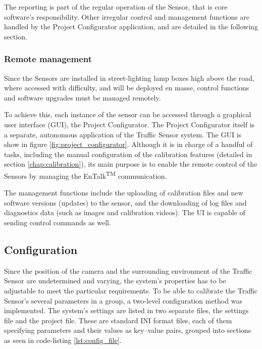 The reporting is part of the regular operation of the Sensor, that is core software's responsibility.
Other irregular control and management functions are handled by the Project Configurator application, and are detailed in the following section.

\subsubsection{Remote management}
Since the Sensors are installed in street-lighting lamp boxes high above the road, where accessed with difficulty, and will be deployed en masse, control functions and software upgrades must be managed remotely.

To achieve this, each instance of the sensor can be accessed through a graphical user interface (GUI), the Project Configurator.
The Project Configurator itself is a separate, autonomous application of the Traffic Sensor system.
The GUI is show in figure \ref{fig:project_configurator}.
Although it is in charge of a handful of tasks, including the manual configuration of the calibration features (detailed in section \ref{chap:calibration}), its main purpose is to enable the remote control of the Sensors by managing the EnTalk\textsuperscript{TM} communication.

The management functions include the uploading of calibration files and new software versions (updates) to the sensor, and the downloading of log files and diagnostics data (such as images and calibration videos).
The UI is capable of sending control commands as well.
\subsection{Configuration}\label{subs:ProjectConfigurator}
Since the position of the camera and the surrounding environment of the Traffic Sensor are undetermined and varying, the system's properties has to be adjustable to meet the particular requirements.
To be able to calibrate the Traffic Sensor's several parameters in a group, a two-level configuration method was implemented.
The system's settings are listed in two separate files, the settings file and the project file.
These are standard INI format files, each of them specifying parameters and their values as key--value pairs, grouped into sections as seen in code-listing \ref{lst:config_file}.

